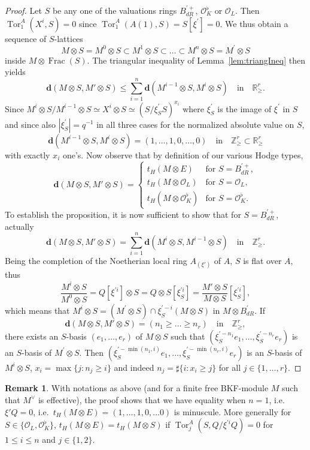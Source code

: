 \documentclass[11pt]{article}
\theoremstyle{definition}
\newtheorem{rema}[theo]{Remark}
\numberwithin{equation}{section}
\numberwithin{figure}{section}
\numberwithin{table}{section}
\DeclareMathOperator{\Tor}{Tor}
\DeclareMathOperator{\Frac}{Frac}
\newcommand*{\dR}{dR}
\begin{document}
\begin{proof}
Let $S$ be any one of the valuations rings $B_{\dR}^{\prime+}$, $\mathcal{O}_{K}^{\flat}$ or $\mathcal{O}_{L}$. Then $\Tor_{1}^{A}(X^{i},S)=0$ since $\Tor_{1}^{A}(A(1),S)=S[\xi^{\prime}]=0$. We thus obtain a sequence of $S$-lattices
\[
M\otimes S=M^{0}\otimes S\subset M^{1}\otimes S\subset\dots\subset M^{n}\otimes S=M^{\prime}\otimes S
\]
inside $M\otimes\Frac(S)$. The triangular inequality of Lemma~\ref{lem:triangIneq} then yields
\[
\mathbf{d}\left(M\otimes S,M'\otimes S\right)\leq\sum_{i=1}^{n}\mathbf{d}\left(M^{i-1}\otimes S,M^{i}\otimes S\right)\quad\text{in}\quad\mathbb{R}_{\geq}^{r}.
\]
Since $M^{i}\otimes S/M^{i-1}\otimes S\simeq X^{i}\otimes S\simeq(S/\xi_{S}^{\prime}S)^{x_{i}}$ where $\xi_{S}^{\prime}$ is the image of $\xi^{\prime}$ in $S$ and since also $\left|\xi_{S}^{\prime}\right|=q^{-1}$ in all three cases for the normalized absolute value on $S$,
\[
\mathbf{d}\left(M^{i-1}\otimes S,M^{i}\otimes S\right)=(1,\dots,1,0,\dots,0)\quad\text{in}\quad\mathbb{Z}_{\geq}^{r}\subset\mathbb{R}_{\geq}^{r}
\]
with exactly $x_{i}$ one's. Now observe that by definition of our various Hodge types,
\[
\mathbf{d}\left(M\otimes S,M'\otimes S\right)=
\begin{cases}
t_{H}\left(M\otimes E\right) & \text{for }S=B_{\dR}^{\prime+},\\
t_{H}(M\otimes\mathcal{O}_{L}) & \text{for }S=\mathcal{O}_{L},\\
t_{H}(M\otimes\mathcal{O}_{K}^{\flat}) & \text{for }S=\mathcal{O}_{K}^{\flat}.
\end{cases}
\]
To establish the proposition, it is now sufficient to show that for $S=B_{\dR}^{\prime+}$, actually
\[
\mathbf{d}\left(M\otimes S,M'\otimes S\right)=\sum_{i=1}^{n}\mathbf{d}\left(M^{i}\otimes S,M^{i-1}\otimes S\right)\quad\text{in}\quad\mathbb{Z}_{\geq}^{r}.
\]
Being the completion of the Noetherian local ring $A_{(\xi')}$ of $A$, $S$ is flat over $A$, thus
\[
\frac{M^{i}\otimes S}{M^{0}\otimes S}=Q[\xi^{\prime i}]\otimes S=Q\otimes S[\xi_{S}^{\prime i}]=\frac{M'\otimes S}{M\otimes S}[\xi_{S}^{\prime i}],
\]
which means that $M^{i}\otimes S=(M^{\prime}\otimes S)\cap\xi_{S}^{\prime-i}(M\otimes S)$ in $M\otimes B_{\dR}^{\prime}$. If
\[
\mathbf{d}\left(M\otimes S,M'\otimes S\right)=(n_{1}\geq\dots\geq n_{r})\quad\text{in}\quad\mathbb{Z}_{\geq}^{r},
\]
there exists an $S$-basis $(e_{1},\dots,e_{r})$ of $M\otimes S$ such that $(\xi_{S}^{\prime-n_{1}}e_{1},\dots,\xi_{S}^{\prime-n_{r}}e_{r})$ is an $S$-basis of $M^{\prime}\otimes S$. Then $(\xi_{S}^{\prime-\min(n_{1},i)}e_{1},\dots,\xi_{S}^{\prime-\min(n_{r},i)}e_{r})$ is an $S$-basis of $M^{i}\otimes S$, $x_{i}=\max\{j:n_{j}\geq i\}$ and indeed $n_{j}=\sharp\{i:x_{i}\geq j\}$ for all $j\in\{1,\dots,r\}$.
\end{proof}
\begin{rema}
With notations as above (and for a finite free BKF-module $M$ such that $M^{\vee}$ is effective), the proof shows that we have equality when $n=1$, i.e.~$\xi'Q=0$, i.e.~$t_{H}(M\otimes E)=(1,\dots,1,0,\dots0)$ is minuscule. More generally for $S\in\{\mathcal{O}_{L},\mathcal{O}_{K}^{\flat}\}$, $t_{H}(M\otimes E)=t_{H}(M\otimes S)$ if $\Tor_{j}^{A}(S,Q/\xi^{\prime i}Q)=0$ for $1\leq i\leq n$ and $j\in\{1,2\}$.
\end{rema}
\end{document}
